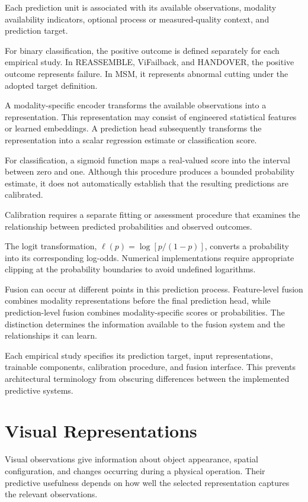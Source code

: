 Each prediction unit is associated with its available observations, modality availability indicators, optional process or measured-quality context, and prediction target.

For binary classification, the positive outcome is defined separately for each empirical study. In REASSEMBLE, ViFailback, and HANDOVER, the positive outcome represents failure. In MSM, it represents abnormal cutting under the adopted target definition.

A modality-specific encoder transforms the available observations into a representation. This representation may consist of engineered statistical features or learned embeddings. A prediction head subsequently transforms the representation into a scalar regression estimate or classification score.

For classification, a sigmoid function maps a real-valued score into the interval between zero and one. Although this procedure produces a bounded probability estimate, it does not automatically establish that the resulting predictions are calibrated.

Calibration requires a separate fitting or assessment procedure that examines the relationship between predicted probabilities and observed outcomes.

The logit transformation, \(\ell(p)=\log[p/(1-p)]\), converts a probability into its corresponding log-odds. Numerical implementations require appropriate clipping at the probability boundaries to avoid undefined logarithms.

Fusion can occur at different points in this prediction process. Feature-level fusion combines modality representations before the final prediction head, while prediction-level fusion combines modality-specific scores or probabilities. The distinction determines the information available to the fusion system and the relationships it can learn.

Each empirical study specifies its prediction target, input representations, trainable components, calibration procedure, and fusion interface. This prevents architectural terminology from obscuring differences between the implemented predictive systems.

\section{Visual Representations}

Visual observations give information about object appearance, spatial configuration, and changes occurring during a physical operation. Their predictive usefulness depends on how well the selected representation captures the relevant observations.


